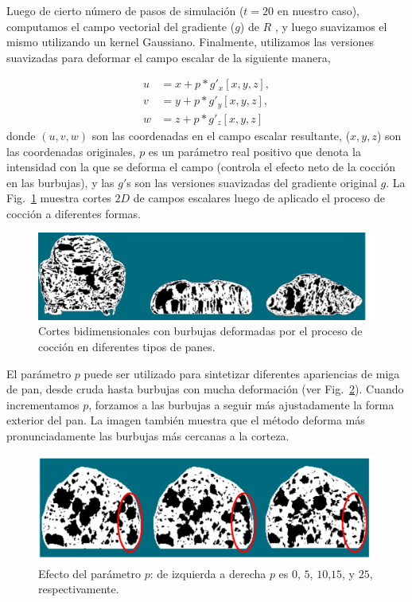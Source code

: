 \documentclass[spanish,a4paper,openright,11pt]{book}
\begin{document}
Luego de cierto número de pasos de simulación ($t=20$ en nuestro caso), computamos el campo vectorial del gradiente ($g$) de $R$ \cite{Gonzalez2006}, y luego suavizamos el mismo utilizando un kernel Gaussiano.
Finalmente, utilizamos las versiones suavizadas para deformar el campo escalar de la siguiente manera,

\begin{align*}
\displaystyle
u &= x+p*g'_{x}[x,y,z],\\
v &= y+p*g'_{y}[x,y,z],\\
w &= z+p*g'_{z}[x,y,z]
\end{align*}
donde $(u,v,w)$ son las coordenadas en el campo escalar resultante, ($x,y,z$) son las coordenadas originales, $p$ es un parámetro real positivo que denota la intensidad con la que se deforma el campo (controla el efecto neto de la cocción en las burbujas), y las $g'$s son las versiones suavizadas del gradiente original $g$.
La Fig.~\ref{fg:bakedbubbles} muestra cortes $2D$ de campos escalares luego de aplicado el proceso de cocción a diferentes formas.

\begin{figure}
\includegraphics[width=15cm]{figures/bakedbubbles}
\caption{Cortes bidimensionales con burbujas deformadas por el proceso de cocción en diferentes tipos de panes.}
\label{fg:bakedbubbles}
\end{figure}

El parámetro $p$ puede ser utilizado para sintetizar diferentes apariencias de miga de pan, desde cruda hasta burbujas con mucha deformación (ver Fig.~\ref{fg:parameterp}).
Cuando incrementamos $p$, forzamos a las burbujas a seguir más ajustadamente la forma exterior del pan. 
La imagen también muestra que el método deforma más pronunciadamente las burbujas más cercanas a la corteza.

\begin{figure}
\includegraphics[width=15cm]{figures/parameterp}
\caption{Efecto del parámetro $p$: de izquierda a derecha $p$ es $0$, $5$, $10$,$15$, y $25$, respectivamente.}
\label{fg:parameterp}
\end{figure}
\end{document}
